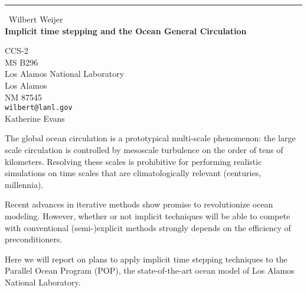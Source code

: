\documentclass{report}
\begin{document}
\begin{center}
\rule{6in}{1pt} \
{\large Wilbert Weijer \\
{\bf Implicit time stepping and the Ocean General Circulation}}

CCS-2 \\ MS B296 \\ Los Alamos National Laboratory \\ Los Alamos \\ NM 87545
\\
{\tt wilbert@lanl.gov}\\
Katherine Evans\end{center}

The global ocean circulation is a prototypical multi-scale phenomenon:
the large scale circulation is controlled by mesoscale turbulence on
the order of tens of kilometers. Resolving these scales is prohibitive
for performing realistic simulations on time scales that are
climatologically relevant (centuries, millennia).

Recent advances in iterative methods show promise to revolutionize
ocean modeling. However, whether or not implicit techniques will be
able to compete with conventional (semi-)explicit methods strongly
depends on the efficiency of preconditioners.

Here we will report on plans to apply implicit time stepping
techniques to the Parallel Ocean Program (POP), the state-of-the-art
ocean model of Los Alamos National Laboratory.
\end{document}

